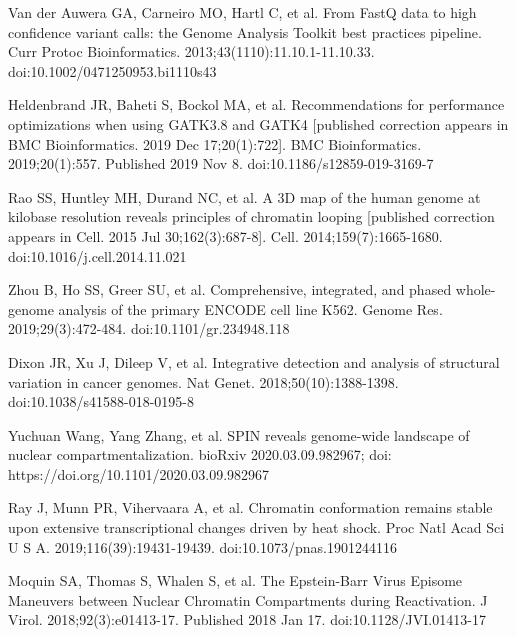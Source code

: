 \documentclass[a4paper,12pt]{article}
\begin{document}


\begin{thebibliography}{300}


Van der Auwera GA, Carneiro MO, Hartl C, et al. From FastQ data to high confidence variant calls: the Genome Analysis Toolkit best practices pipeline. Curr Protoc Bioinformatics. 2013;43(1110):11.10.1-11.10.33. doi:10.1002/0471250953.bi1110s43

Heldenbrand JR, Baheti S, Bockol MA, et al. Recommendations for performance optimizations when using GATK3.8 and GATK4 [published correction appears in BMC Bioinformatics. 2019 Dec 17;20(1):722]. BMC Bioinformatics. 2019;20(1):557. Published 2019 Nov 8. doi:10.1186/s12859-019-3169-7


Rao SS, Huntley MH, Durand NC, et al. A 3D map of the human genome at kilobase resolution reveals principles of chromatin looping [published correction appears in Cell. 2015 Jul 30;162(3):687-8]. Cell. 2014;159(7):1665-1680. doi:10.1016/j.cell.2014.11.021

Zhou B, Ho SS, Greer SU, et al. Comprehensive, integrated, and phased whole-genome analysis of the primary ENCODE cell line K562. Genome Res. 2019;29(3):472-484. doi:10.1101/gr.234948.118

Dixon JR, Xu J, Dileep V, et al. Integrative detection and analysis of structural variation in cancer genomes. Nat Genet. 2018;50(10):1388-1398. doi:10.1038/s41588-018-0195-8

Yuchuan Wang, Yang Zhang, et al. SPIN reveals genome-wide landscape of nuclear compartmentalization. bioRxiv 2020.03.09.982967; doi: https://doi.org/10.1101/2020.03.09.982967

Ray J, Munn PR, Vihervaara A, et al. Chromatin conformation remains stable upon extensive transcriptional changes driven by heat shock. Proc Natl Acad Sci U S A. 2019;116(39):19431-19439. doi:10.1073/pnas.1901244116

Moquin SA, Thomas S, Whalen S, et al. The Epstein-Barr Virus Episome Maneuvers between Nuclear Chromatin Compartments during Reactivation. J Virol. 2018;92(3):e01413-17. Published 2018 Jan 17. doi:10.1128/JVI.01413-17


\end{thebibliography}
\end{document}
